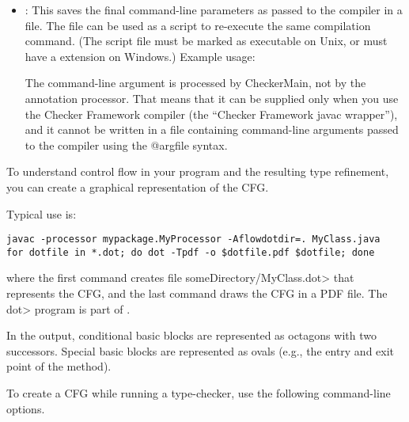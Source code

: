 
\begin{itemize}

\item {}:
  This saves the final command-line parameters as passed to the compiler in a file.
  The file can be used as a script to re-execute the same compilation command.
  (The script file must be marked as executable on Unix, or
  must have a  extension on Windows.)
  Example usage: 

  The  command-line argument is processed by
  CheckerMain, not by the annotation processor.  That means that it can be
  supplied only when you use the Checker Framework compiler (the ``Checker
  Framework javac wrapper''), and it cannot be written in a file containing
  command-line arguments passed to the compiler using the @argfile syntax.

\end{itemize}


To understand control flow in your program and the resulting type
refinement, you can create a graphical representation of the CFG.

Typical use is:

\begin{Verbatim}
javac -processor mypackage.MyProcessor -Aflowdotdir=. MyClass.java
for dotfile in *.dot; do dot -Tpdf -o $dotfile.pdf $dotfile; done
\end{Verbatim}

\noindent
where the first command creates file \<someDirectory/MyClass.dot> that
represents the CFG, and the last command draws the CFG in a PDF file.
The \<dot> program is part of .

In the output, conditional basic blocks are represented as octagons with
two successors.  Special basic blocks are represented as ovals (e.g., the
entry and exit point of the method).



To create a CFG while running a type-checker, use the following
command-line options.

